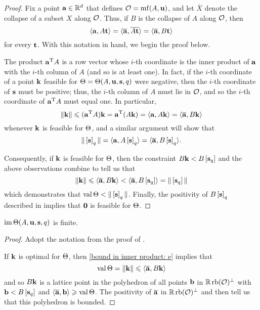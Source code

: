 \documentclass[11pt]{amsart}
\renewcommand{\!}[1]{{\color{red}\text{$\star$\,}#1\,$\star$}}
\newcommand{\ol}[1]{\overline{#1}}
\begin{document}
\begin{proof}   
Fix a point $\mathbf{a} \in \mathbb{R}^d$ that defines $\mathcal{O}  = \operatorname{mf}(A, \mathbf{u})$, and let $\ol{X}$ denote the collapse of a subset $X$ along $\mathcal{O}$.  Thus, if $B$ is the collapse of $A$ along $\mathcal{O}$, then
\[ \iprod{{\vv{a}}}{A \vv{t}} = \iprod{\ol{\vv{a}}}{\ol{A \vv{t}}} = \iprod{\ol{\vv{a}}}{B \vv{t}} \] for every $\mathbf{t}$.  With this notation in hand, we begin the proof below.

The product $\mathbf{a}^{\mathrm{T}} A $ is a row vector whose $i$-th coordinate is the inner product of $\mathbf{a}$ with the $i$-th column of $A$ (and so is at least one).   In fact, if the $i$-th coordinate of a point $\mathbf{k}$ feasible for $\Theta = \Theta(A, \mathbf{u}, \mathbf{s}, q)$ were negative, then the $i$-th coordinate of $\mathbf{s}$ must be positive;  thus, the $i$-th column of $A$ must lie in $\mathcal{O}$, and so the $i$-th coordinate of $\mathbf{a}^{\mathrm{T}} A$ must equal one.  In particular, 
%
\begin{equation} 
\label{bound in inner product: e}
\norm{\vv{k}} \leq (\vv{a}^{\mathrm{T}} A) \vv{k} =  \vv{a}^{\mathrm{T}} (A \vv{k}) = \iprod{\vv{a}}{A \vv{k}} = \iprod{\ol{\vv{a}}}{B \vv{k}} 
\end{equation}
whenever $\mathbf{k}$ is feasible for $\Theta$, and a similar argument will show that 
\begin{equation}  
\label{norm of tail: e}
\norm{\tail{\vv{s}}_q} =  \iprod{\vv{a}}{A \tail{\vv{s}}_q} = \iprod{\ol{\vv{a}}}{B \tail{\vv{s}}_q}.
\end{equation}

Consequently, if $\mathbf{k}$ is feasible for $\Theta$, then the constraint $B\mathbf{k} <B \left[ \mathbf{s}_q \right]$ and the above observations combine to tell us that \[ \norm{\vv{k}} \leq \iprod{\ol{\vv{a}}}{B \vv{k}} < \iprod{\ol{\vv{a}}}{B \tail{\vv{s}_q}} = \norm{\tail{\vv{s}_q}}\] 
which demonstrates that $\operatorname{val} \Theta < \| \left[ \mathbf{s} \right]_q \|$.  Finally, the positivity of $B\left[ \mathbf{s} \right]_q$ described in  implies that $\mathbf{0}$ is feasible for $\Theta$.
\end{proof}


\begin{corollary}
\label{finite image: C}
$\operatorname{im} \Theta(A, \mathbf{u}, \mathbf{s}, q)$ is finite.
\end{corollary}

\begin{proof}  Adopt the notation from the proof of .

If $\mathbf{k}$ is optimal for $\Theta$, then \eqref{bound in inner product: e} implies that \[ \val \ip = \norm{\vv{k}} \leq \iprod{\ol{\vv{a}}}{B \vv{k}}\] and so $B \mathbf{k}$ is a lattice point in the polyhedron of all points $\mathbf{b}$  in $\mathbb{R} \operatorname{rb}(\mathcal{O})^{\perp}$ with $\mathbf{b} < B \left[ \mathbf{s}_q \right]$  and $\iprod{\ol{\vv{a}}}{\vv{b}} \geq \val \ip$.  The positivity of $\ol{\vv{a}}$ in $\mathbb{R} \operatorname{rb}(\mathcal{O})^{\perp}$ and  then tell us  that this polyhedron is bounded.  
\end{proof}
\end{document}
